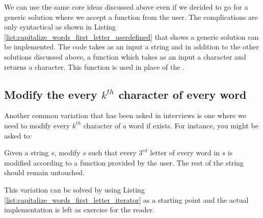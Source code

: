 We can use the same core ideas discussed above even if we decided to go for a generic solution where we accept a function from the user. The complications are only syntactical as shown in 
Listing \ref{list:capitalize_words_first_letter_userdefined} that shows a generic solution can be implemented. The code takes as an input a string and in addition to the other solutions discussed above, a function  which takes as an input a character and returns a character. This function is used in place of the .




\subsection{Modify the every $k^{th}$ character of every word}
Another common variation that has been asked in interviews is one where we need to modify every $k^{th}$ character of a word if exists. For instance, you might be asked to:

\begin{exercise}
Given a string $s$, modify $s$ such that every $3^{rd}$ letter of every word in $s$ is modified according to a function provided by the user. The rest of the string should remain untouched.
\end{exercise}

This variation can be solved by using Listing \ref{list:capitalize_words_first_letter_iterator} as a starting point and the actual implementation is left as exercise for the reader.


